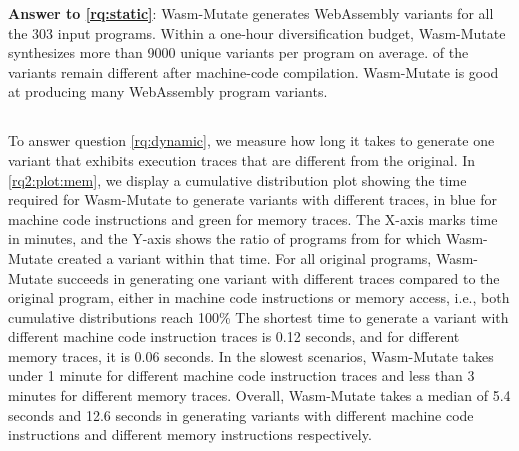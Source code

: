 \documentclass[a4paper,fleqn]{cas-dc}
\newcommand*\badge[1]{ \colorbox{red}{\color{white}#1}}
\newcommand{\tool}{{\sc Wasm-Mutate}\xspace}
\newcommand{\Wasm}{WebAssembly\xspace}
\newcommand{\wasm}{\Wasm}
\newcommand{\todo}[1]{%
\refstepcounter{todo}
\noindent\textbf{\badge{TODO}} {\color{red}#1}
\addcontentsline{td}{todo}
{\color{red}\thesection.\thetodo\xspace #1}}
\begin{document}






\begin{tcolorbox}[boxrule=1pt,arc=.3em,boxsep=-1.3mm]
  \textbf{Answer to \ref{rq:static}}: \tool generates \wasm variants for all the 303 input programs. 
  Within a one-hour diversification budget, \tool synthesizes more than 9000 unique  variants per program on average. 
  \preserved of the variants remain different after machine-code compilation.
  \tool is good at producing many \Wasm program variants.
\end{tcolorbox}


\subsection{\rqdynamic}


To answer question \ref{rq:dynamic},   we measure how long it takes to generate one variant that exhibits execution traces that are different from the original.
In \autoref{rq2:plot:mem}, we display a cumulative distribution plot showing the time required for \tool to generate variants with different traces, in blue for machine code instructions and green for memory traces.
The X-axis marks time in minutes, and the Y-axis shows the ratio of programs from \nProgramsRosetta for which \tool created a variant within that time.
For all original programs, \tool succeeds in  generating one variant with different traces compared to the original program, either in machine code instructions or memory access, i.e., both cumulative distributions reach 100\%
The shortest time to generate a variant with different machine code instruction traces is 0.12 seconds, and for different memory traces, it is 0.06 seconds. 
In the slowest scenarios, \tool takes under 1 minute for different machine code instruction traces and less than 3 minutes for different memory traces.
Overall, \tool takes a median of 5.4 seconds and 12.6 seconds in generating variants with different machine code instructions and different memory instructions respectively.
\end{document}
